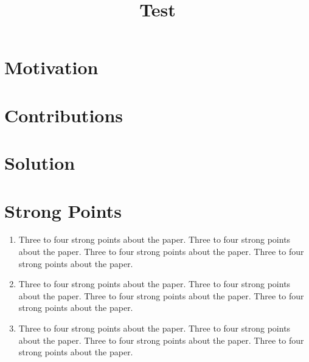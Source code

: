 \documentclass[conference]{IEEEtran}
\begin{document}
\title{Test}


\author{
\and
{}
}
\maketitle
\IEEEpeerreviewmaketitle



\section{Motivation}

\lipsum[2] \cite{IEEEhowto:kopka}

\section{Contributions}

\lipsum[2]

\section{Solution}

\lipsum[2-5]

\section{Strong Points}

\begin{enumerate}
 \item Three to four strong points about the paper. Three to four strong points about the paper. Three to four strong points about the paper. Three to four strong points about the paper.
 \item Three to four strong points about the paper. Three to four strong points about the paper. Three to four strong points about the paper. Three to four strong points about the paper.
 \item Three to four strong points about the paper. Three to four strong points about the paper. Three to four strong points about the paper. Three to four strong points about the paper.
\end{enumerate}
\end{document}
